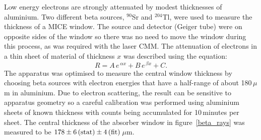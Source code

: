 Low energy electrons are strongly attenuated by modest thicknesses of aluminium. 
Two different beta sources, $^{90}$Sr and $^{204}$Tl, were used to measure the thickness of a MICE
window. The source and detector (Geiger tube) were on opposite sides
of the window so there was no need to 
move the window during this process, as was required with the laser CMM. 
The attenuation of electrons in a thin sheet of material of
thickness $x$ was described using the equation:
\begin{equation}
  R = A \, e^{\,\alpha x} + B\, e^{\,\beta x} + C.
\end{equation}
The apparatus was optimised to measure the central window thickness by
choosing beta sources with electron energies that have a half-range of
about 180\,$\mu$m in aluminium.
Due to electron scattering, the result can be sensitive to apparatus
geometry so a careful calibration was performed using aluminium sheets
of known thickness with
counts being accumulated for 10\,minutes per sheet.
The central thickness of the absorber window in figure~\ref{beta_rays}
was measured to be $178 \pm 6\,{\rm (stat)} \pm 4\,{\rm (fit)}$\,$\mu$m.

